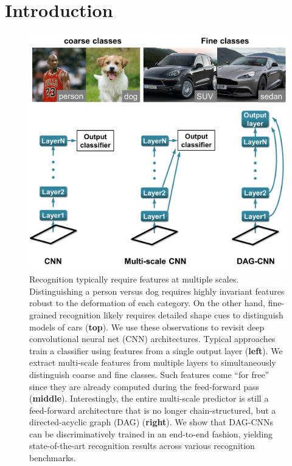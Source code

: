 \documentclass[10pt,twocolumn,letterpaper]{article}
\begin{document}
\section{Introduction}


\begin{figure}[t!]
\centering
\includegraphics[width=\columnwidth]{fig/splash}
\caption{Recognition typically require features at multiple scales. Distinguishing a person versus dog requires highly invariant features robust to the deformation of each category. On the other hand, fine-grained recognition likely requires detailed shape cues to distinguish models of cars ({\bf top}). We use these observations to revisit deep convolutional neural net (CNN) architectures. Typical approaches train a classifier using features from a single output layer ({\bf left}). We extract multi-scale features from multiple layers to simultaneously distinguish coarse and fine classes. Such features come ``for free'' since they are already computed during the feed-forward pass ({\bf middle}). Interestingly, the entire multi-scale predictor is still a feed-forward architecture that is no longer chain-structured, but a directed-acyclic graph (DAG) ({\bf right}). We show that DAG-CNNs can be discriminatively trained in an end-to-end fashion, yielding state-of-the-art recognition results across various recognition benchmarks. %
\label{fig:splash}}
\end{figure}
\end{document}
